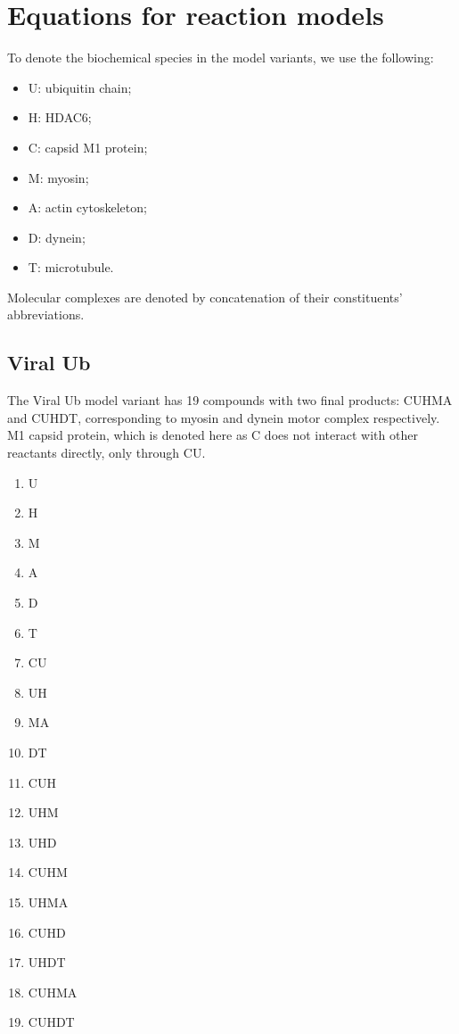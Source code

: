 \section{Equations for reaction models}
\label{appendix:reactionModelsEquations}

To denote the biochemical species in the model variants, we use the following:

\begin{itemize}
\item U: ubiquitin chain;
\item H: HDAC6;
\item C: capsid M1 protein;
\item M: myosin;
\item A: actin cytoskeleton;
\item D: dynein;
\item T: microtubule.
\end{itemize}

Molecular complexes are denoted by concatenation of their constituents’ abbreviations.

\subsection{Viral Ub}

The Viral Ub model variant has 19 compounds with two final products: CUHMA and CUHDT, corresponding to myosin and dynein motor complex respectively. M1 capsid protein, which is denoted here as C does not interact with other reactants directly, only through CU.

\begin{multicols}{4}
\begin{enumerate}
\item U
\item H
\item M
\item A
\item D
\item T

\item CU
\item UH
\item MA
\item DT

\item CUH
\item UHM
\item UHD

\item CUHM
\item UHMA
\item CUHD
\item UHDT

\item CUHMA
\item CUHDT
\end{enumerate}
\end{multicols}

